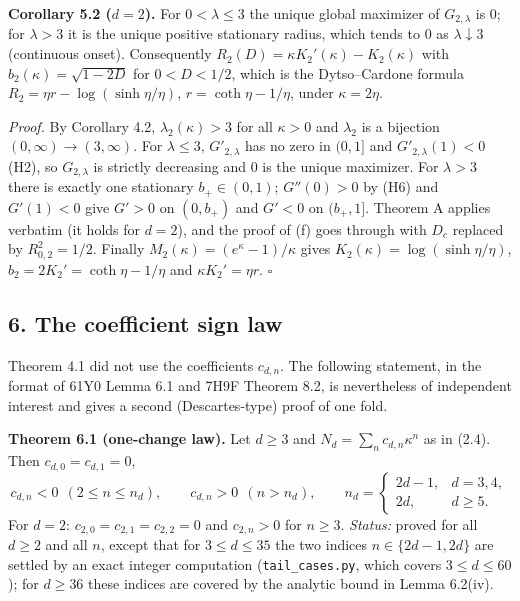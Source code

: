 \documentclass[
  11pt,
  a4paper,
]{article}
\begin{document}
\textbf{Corollary 5.2 (\(d=2\)).} For \(0<\lambda\le3\) the unique
global maximizer of \(G_{2,\allowbreak{}\lambda}\) is \(0\); for \(\lambda>3\) it is
the unique positive stationary radius, which tends to \(0\) as
\(\lambda\downarrow3\) (continuous onset). Consequently
\(R_2(D)=\kappa K_2'(\kappa)-K_2(\kappa)\) with
\(b_2(\kappa)=\sqrt{1-2D}\) for \(0<D<1/2\), which is the Dytso--Cardone
formula \(R_2=\eta r-\log(\sinh\eta/\eta)\), \(r=\coth\eta-1/\eta\),
under \(\kappa=2\eta\).

\emph{Proof.} By Corollary 4.2, \(\lambda_2(\kappa)>3\) for all
\(\kappa>0\) and \(\lambda_2\) is a bijection
\((0,\allowbreak{}\infty)\to(3,\allowbreak{}\infty)\). For \(\lambda\le3\), \(G'_{2,\allowbreak{}\lambda}\) has
no zero in \((0,\allowbreak{}1]\) and \(G'_{2,\allowbreak{}\lambda}(1)<0\) (H2), so
\(G_{2,\allowbreak{}\lambda}\) is strictly decreasing and \(0\) is the unique
maximizer. For \(\lambda>3\) there is exactly one stationary
\(b_+\in(0,\allowbreak{}1)\); \(G''(0)>0\) by (H6) and \(G'(1)<0\) give \(G'>0\) on
\((0,\allowbreak{}b_+)\) and \(G'<0\) on \((b_+,\allowbreak{}1]\). Theorem A applies verbatim (it
holds for \(d=2\)), and the proof of (f) goes through with \(D_c\)
replaced by \(R_{0,\allowbreak{}2}^2=1/2\). Finally
\(M_2(\kappa)=(e^\kappa-1)/\kappa\) gives
\(K_2(\kappa)=\log(\sinh\eta/\eta)\), \(b_2=2K_2'=\coth\eta-1/\eta\) and
\(\kappa K_2'=\eta r\). \(\square\)

\subsection{6. The coefficient sign law}\label{the-coefficient-sign-law}

Theorem 4.1 did not use the coefficients \(c_{d,\allowbreak{}n}\). The following
statement, in the format of 61Y0 Lemma 6.1 and 7H9F Theorem 8.2, is
nevertheless of independent interest and gives a second (Descartes-type)
proof of one fold.

\textbf{Theorem 6.1 (one-change law).} Let \(d\ge3\) and
\(N_d=\sum_nc_{d,\allowbreak{}n}\kappa^n\) as in (2.4). Then \(c_{d,\allowbreak{}0}=c_{d,\allowbreak{}1}=0\),
\[c_{d,n}<0\ \ (2\le n\le n_d),\qquad c_{d,n}>0\ \ (n>n_d),\qquad n_d=\begin{cases}2d-1,&d=3,4,\\ 2d,&d\ge5.\end{cases}\]
For \(d=2\): \(c_{2,\allowbreak{}0}=c_{2,\allowbreak{}1}=c_{2,\allowbreak{}2}=0\) and \(c_{2,\allowbreak{}n}>0\) for
\(n\ge3\). \emph{Status:} proved for all \(d\ge2\) and all \(n\), except
that for \(3\le d\le35\) the two indices \(n\in\{2d-1,\allowbreak{}2d\}\) are settled
by an exact integer computation ({\small\texttt{tail\_\allowbreak{}cases.\allowbreak{}py}}, which covers
\(3\le d\le60\)); for \(d\ge36\) these indices are covered by the
analytic bound in Lemma 6.2(iv).
\end{document}
